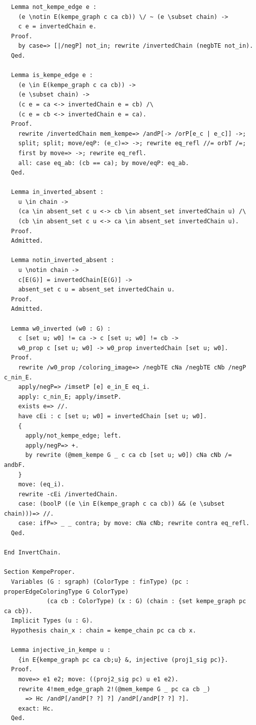 \begin{verbatim}
  Lemma not_kempe_edge e :
    (e \notin E(kempe_graph c ca cb)) \/ ~ (e \subset chain) ->
    c e = invertedChain e.
  Proof.
    by case=> [|/negP] not_in; rewrite /invertedChain (negbTE not_in).
  Qed.

  Lemma is_kempe_edge e : 
    (e \in E(kempe_graph c ca cb)) -> 
    (e \subset chain) -> 
    (c e = ca <-> invertedChain e = cb) /\
    (c e = cb <-> invertedChain e = ca).
  Proof.
    rewrite /invertedChain mem_kempe=> /andP[-> /orP[e_c | e_c]] ->;
    split; split; move/eqP: (e_c)=> ->; rewrite eq_refl //= orbT /=;
    first by move=> ->; rewrite eq_refl.
    all: case eq_ab: (cb == ca); by move/eqP: eq_ab.
  Qed.

  Lemma in_inverted_absent :
    u \in chain -> 
    (ca \in absent_set c u <-> cb \in absent_set invertedChain u) /\
    (cb \in absent_set c u <-> ca \in absent_set invertedChain u).
  Proof.
  Admitted.

  Lemma notin_inverted_absent :
    u \notin chain -> 
    c[E(G)] = invertedChain[E(G)] ->
    absent_set c u = absent_set invertedChain u.
  Proof.
  Admitted.

  Lemma w0_inverted (w0 : G) :
    c [set u; w0] != ca -> c [set u; w0] != cb ->
    w0_prop c [set u; w0] -> w0_prop invertedChain [set u; w0].
  Proof.
    rewrite /w0_prop /coloring_image=> /negbTE cNa /negbTE cNb /negP c_nin_E.
    apply/negP=> /imsetP [e] e_in_E eq_i.
    apply: c_nin_E; apply/imsetP.
    exists e=> //.
    have cEi : c [set u; w0] = invertedChain [set u; w0].
    {
      apply/not_kempe_edge; left. 
      apply/negP=> +. 
      by rewrite (@mem_kempe G _ c ca cb [set u; w0]) cNa cNb /= andbF.
    }
    move: (eq_i).
    rewrite -cEi /invertedChain.
    case: (boolP ((e \in E(kempe_graph c ca cb)) && (e \subset chain)))=> //.
    case: ifP=> _ _ contra; by move: cNa cNb; rewrite contra eq_refl.
  Qed.

End InvertChain.

Section KempeProper.
  Variables (G : sgraph) (ColorType : finType) (pc : properEdgeColoringType G ColorType) 
            (ca cb : ColorType) (x : G) (chain : {set kempe_graph pc ca cb}).
  Implicit Types (u : G).
  Hypothesis chain_x : chain = kempe_chain pc ca cb x.

  Lemma injective_in_kempe u :
    {in E{kempe_graph pc ca cb;u} &, injective (proj1_sig pc)}.
  Proof.
    move=> e1 e2; move: ((proj2_sig pc) u e1 e2).
    rewrite 4!mem_edge_graph 2!(@mem_kempe G _ pc ca cb _) 
      => Hc /andP[/andP[? ?] ?] /andP[/andP[? ?] ?].
    exact: Hc.
  Qed.


\end{verbatim}
